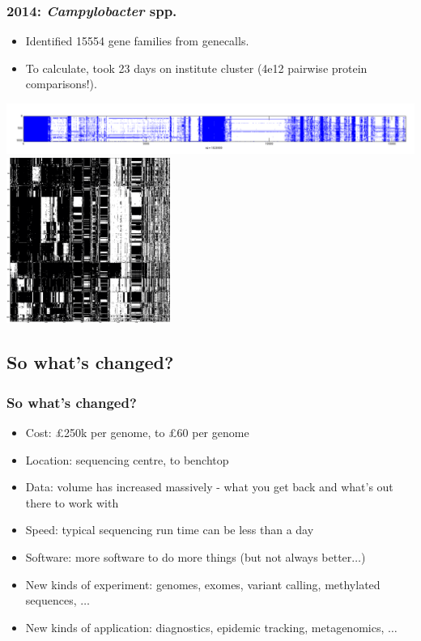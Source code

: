 \begin{frame}
  \frametitle{2014: \textit{Campylobacter} spp.}
  \begin{itemize}
    \item Identified 15554 gene families from genecalls.
    \item To calculate, took 23 days on institute cluster (4e12 pairwise protein comparisons!).  
  \end{itemize}      
  \begin{center}
    \includegraphics[width=1\textwidth]{images/Pres_abs_mat} \\
    \includegraphics[width=0.4\textwidth]{images/campy_presence_absence}    
  \end{center}        
\end{frame}

\subsection{So what's changed?}

\begin{frame}
  \frametitle{So what's changed?}
  \begin{itemize}
    \item Cost: \pounds250k per genome, to \pounds60 per genome
    \item Location: sequencing centre, to benchtop
    \item Data: volume has increased massively - what you get back and what's out there to work with
    \item Speed: typical sequencing run time can be less than a day
    \item Software: more software to do more things (but not always better$\ldots$)
    \item New kinds of experiment: genomes, exomes, variant calling, methylated sequences, $\ldots$
    \item New kinds of application: diagnostics, epidemic tracking, metagenomics, $\ldots$
  \end{itemize}       
\end{frame}